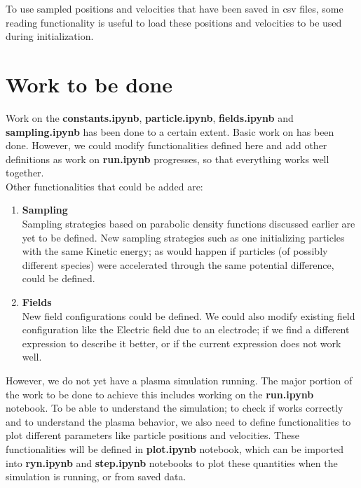\documentclass[12pt]{article}
\begin{document}
	\noindent To use sampled positions and velocities that have been saved in csv files, some reading functionality is useful to load these positions and velocities to be used during initialization.
	
	
	\section{Work to be done}
	Work on the \textbf{constants.ipynb}, \textbf{particle.ipynb}, \textbf{fields.ipynb} and \textbf{sampling.ipynb} has been done to a certain extent. Basic work on  has been done. However, we could modify functionalities defined here and add other definitions as work on \textbf{run.ipynb} progresses, so that everything works well together. \\
	Other functionalities that could be added are:
	\begin{enumerate}
		\item \textbf{Sampling} \\
		Sampling strategies based on parabolic density functions discussed earlier are yet to be defined. New sampling strategies such as one initializing particles with the same Kinetic energy; as would happen if particles (of possibly different species) were accelerated through the same potential difference, could be defined.
		\item \textbf{Fields} \\
		New field configurations could be defined. We could also modify existing field configuration like the Electric field due to an electrode; if we find a different expression to describe it better, or if the current expression does not work well.
	\end{enumerate}
	However, we do not yet have a plasma simulation running. The major portion of the work to be done to achieve this includes working on the \textbf{run.ipynb} notebook. To be able to understand the simulation; to check if works correctly and to understand the plasma behavior, we also need to define functionalities to plot different parameters like particle positions and velocities. These functionalities will be defined in \textbf{plot.ipynb} notebook, which can be imported into \textbf{ryn.ipynb} and \textbf{step.ipynb} notebooks to plot these quantities when the simulation is running, or from saved data. 
	
\end{document}
